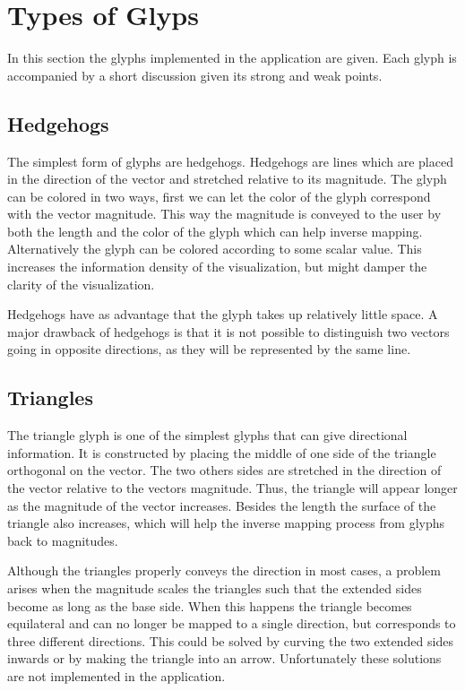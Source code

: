 \section{Types of Glyps} %
\label{sec:types_of_glyps}
In this section the glyphs implemented in the application are given. Each glyph is accompanied by a short discussion given its strong and weak points.
\subsection{Hedgehogs} %
\label{sub:hedgehogs}
The simplest form of glyphs are hedgehogs. Hedgehogs are lines which are placed in the direction of the vector and stretched relative to its magnitude. The glyph can be colored in two ways, first we can let the color of the glyph correspond with the vector magnitude. This way the magnitude is conveyed to the user by both the length and the color of the glyph which can help inverse mapping. Alternatively the glyph can be colored according to some scalar value. This increases the information density of the visualization, but might damper the clarity of the visualization.

Hedgehogs have as advantage that the glyph takes up relatively little space. A major drawback of hedgehogs is that it is not possible to distinguish two vectors going in opposite directions, as they will be represented by the same line. 

\subsection{Triangles} %
\label{sub:triangles}
The triangle glyph is one of the simplest glyphs that can give directional information. It is constructed by placing the middle of one side of the triangle orthogonal on the vector. The two others sides are stretched in the direction of the vector relative to the vectors magnitude. Thus, the triangle will appear longer as the magnitude of the vector increases. Besides the length the surface of the triangle also increases, which will help the inverse mapping process from glyphs back to magnitudes.

Although the triangles properly conveys the direction in most cases, a problem arises when the magnitude scales the triangles such that the extended sides become as long as the base side.  When this happens the triangle becomes equilateral and can no longer be mapped to a single direction, but corresponds to three different directions. This could be solved by curving the two extended sides inwards or by making the triangle into an arrow. Unfortunately these solutions are not implemented in the application. 

